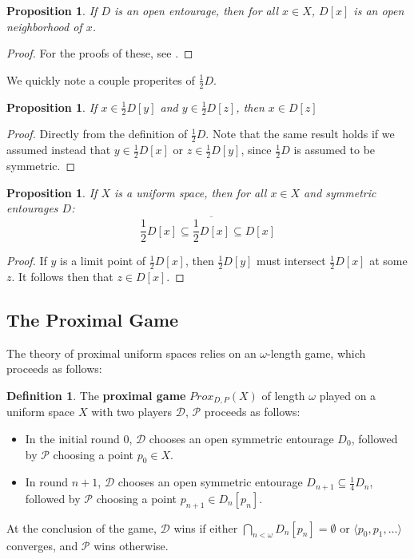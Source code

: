 \documentclass{amsart}
\newtheorem{prop}[thm]{Proposition}
\theoremstyle{definition}
\newtheorem{defn}[thm]{Definition}
\theoremstyle{remark}
\newcommand{\<}{\langle}
\renewcommand{\>}{\rangle}
\newcommand{\cl}[1]{\overline{#1}}
\newcommand{\proxgame}[1]{Prox_{D,P}(#1)}
\newcommand{\pl}[1]{\mathscr{#1}}
\begin{document}
\begin{prop}
  If $D$ is an open entourage, then for all $x\in X$, $D[x]$ is an open neighborhood of $x$.
\end{prop}

\begin{proof}
  For the proofs of these, see \cite{e}.
\end{proof}

We quickly note a couple properites of $\frac{1}{2}D$.

\begin{prop}
  If $x\in \frac{1}{2}D[y]$ and $y\in \frac{1}{2}D[z]$, then $x\in D[z]$
\end{prop}

\begin{proof}
  Directly from the definition of $\frac{1}{2}D$. Note that the same result holds if we assumed instead that $y\in \frac{1}{2}D[x]$ or $z\in \frac{1}{2}D[y]$, since $\frac{1}{2}D$ is assumed to be symmetric.
\end{proof}

\begin{prop}
  If $X$ is a uniform space, then for all $x\in X$ and symmetric entourages $D$:
    \[
      \frac{1}{2}D[x]\subseteq \cl{\frac{1}{2}D[x]}\subseteq D[x]
    \]
\end{prop}

\begin{proof}
  If $y$ is a limit point of $\frac{1}{2}D[x]$, then $\frac{1}{2}D[y]$ must intersect $\frac{1}{2}D[x]$ at some $z$. It follows then that $z\in D[x]$.
\end{proof}

\subsection{The Proximal Game}

The theory of proximal uniform spaces relies on an $\omega$-length game, which proceeds as follows:

\begin{defn}
  The \textbf{proximal game} $\proxgame{X}$ of length $\omega$ played on a uniform space $X$ with two players $\pl D$, $\pl P$ proceeds as follows:
    \begin{itemize}
      \item In the initial round $0$, $\pl D$ chooses an open symmetric entourage $D_0$, followed by $\pl P$ choosing a point $p_0\in X$.
      \item In round $n+1$, $\pl D$ chooses an open symmetric entourage $D_{n+1}\subseteq \frac{1}{4}D_n$, followed by $\pl P$ choosing a point $p_{n+1}\in D_n[p_n]$.
    \end{itemize}
  At the conclusion of the game, $\pl D$ wins if either $\bigcap_{n<\omega}D_n[p_n]=\emptyset$ or $\<p_0,p_1,\dots\>$ converges, and $\pl P$ wins otherwise.
\end{defn}
\end{document}
